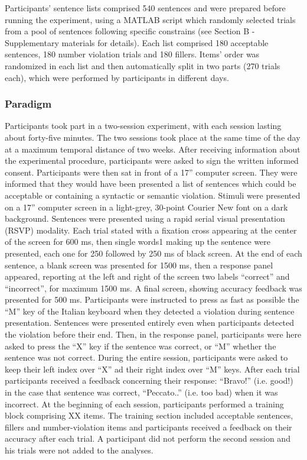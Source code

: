 Participants’ sentence lists comprised 540 sentences and were prepared before running the experiment, using a MATLAB script which randomly selected trials from a pool of sentences following specific constrains (see Section B - Supplementary materials for details). Each list comprised 180 acceptable sentences, 180 number violation trials and 180 fillers. Items’ order was randomized in each list and then automatically split in two parts (270 trials each), which were performed by participants in different days.

\subsubsection{Paradigm}
Participants took part in a two-session experiment, with each session lasting about forty-five minutes. The two sessions took place at the same time of the day at a maximum temporal distance of two weeks. After receiving information about the experimental procedure, participants were asked to sign the written informed consent. Participants were then sat in front of a 17” computer screen. They were informed that they would have been presented a list of sentences which could be acceptable or containing a syntactic or semantic violation. 
Stimuli were presented on a 17” computer screen in a light-grey, 30-point Courier New font on a dark background. Sentences were presented using a rapid serial visual presentation (RSVP) modality. Each trial stated with a fixation cross appearing at the center of the screen for 600 ms, then single words1 making up the sentence were presented, each one for 250 followed by 250 ms of black screen. At the end of each sentence, a blank screen was presented for 1500 ms, then a response panel appeared, reporting at the left and right of the screen two labels “correct” and “incorrect”, for maximum 1500 ms. A final screen, showing accuracy feedback was presented for 500 ms.
Participants were instructed to press as fast as possible the “M” key of the Italian keyboard when they detected a violation during sentence presentation. Sentences were presented entirely even when participants detected the violation before their end.  Then, in the response panel, participants were here asked to press the “X” key if the sentence was correct, or “M” whether the sentence was not correct. During the entire session, participants were asked to keep their left index over “X” ad their right index over “M” keys. After each trial participants received a feedback concerning their response: “Bravo!” (i.e. good!) in the case that sentence was correct, “Peccato..” (i.e. too bad) when it was incorrect.
At the beginning of each session, participants performed a training block comprising XX items. The training section included acceptable sentences, fillers and number-violation items and participants received a feedback on their accuracy after each trial. 
A participant did not perform the second session and his trials were not added to the analyses. 

